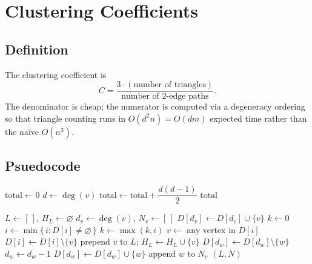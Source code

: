 \documentclass[11pt]{article}
\begin{document}
\section{Clustering Coefficients}


\subsection{Definition}

The clustering coefficient is
\[
    C = \frac{3 \cdot (\text{number of triangles})}{\text{number of 2-edge paths}}.
\]
The denominator is cheap; the numerator is computed via a degeneracy ordering so that
triangle counting runs in $O(d^2 n) = O(dm)$ expected time rather than the naïve $O(n^3)$.
\subsection{Psuedocode}
\begin{algorithm}
    \caption{Number of 2-Edge Paths}\label{alg:paths}
    \begin{algorithmic}[1]
        \State $\text{total} \gets 0$
            \State $d \gets \deg(v)$
            \State $\text{total} \gets \text{total} + \dfrac{d(d-1)}{2}$ 
        \EndFor
        \State \Return $\text{total}$
        \EndProcedure
    \end{algorithmic}
\end{algorithm}

\begin{algorithm}
    \caption{Degeneracy Ordering}\label{alg:degen}
    \begin{algorithmic}[1]
        \State $L \gets [\,]$, \quad $H_L \gets \varnothing$ 
            \State $d_v \gets \deg(v)$, \quad $N_v \gets [\,]$ 
        \EndFor
            \State $D[d_v] \gets D[d_v] \cup \{v\}$ 
        \EndFor
        \State $k \gets 0$
            \State $i \gets \min\{\, i : D[i] \neq \varnothing \,\}$
            \State $k \gets \max(k, i)$
            \State $v \gets$ any vertex in $D[i]$
            \State $D[i] \gets D[i] \setminus \{v\}$
            \State prepend $v$ to $L$; \quad $H_L \gets H_L \cup \{v\}$
                \State $D[d_w] \gets D[d_w] \setminus \{w\}$
                \State $d_w \gets d_w - 1$
                \State $D[d_w] \gets D[d_w] \cup \{w\}$
                \State append $w$ to $N_v$
            \EndFor
        \EndFor
        \State \Return $(L, N)$
        \EndProcedure
    \end{algorithmic}
\end{algorithm}
\end{document}
